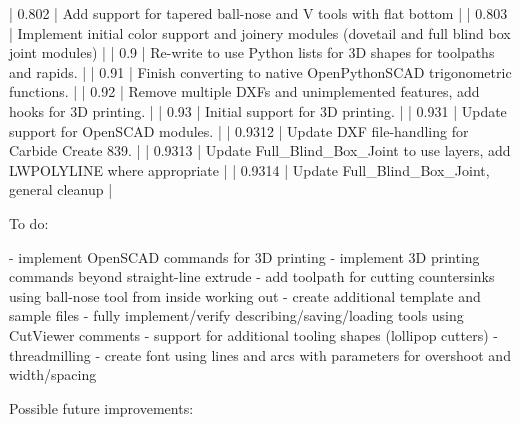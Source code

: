 \documentclass{ltxdoc}
\begin{document}
\begin{readme}
| 0.802         | Add support for tapered ball-nose and  V tools with flat bottom                                                                                                                 |
| 0.803         | Implement initial color support and joinery modules (dovetail and full blind box joint modules)                                                                                 |
| 0.9           | Re-write to use Python lists for 3D shapes for toolpaths and rapids.                                                                                                            |
| 0.91          | Finish converting to native OpenPythonSCAD trigonometric functions.                                                                                                             |
| 0.92          | Remove multiple DXFs and unimplemented features, add hooks for 3D printing.                                                                                                     |
| 0.93          | Initial support for 3D printing.                                                                                                                                                |
| 0.931         | Update support for OpenSCAD modules.                                                                                                                                            |
| 0.9312        | Update DXF file-handling for Carbide Create 839.                                                                                                                                |
| 0.9313        | Update Full_Blind_Box_Joint to use layers, add LWPOLYLINE where appropriate                                                                                                  |
| 0.9314        | Update Full_Blind_Box_Joint, general cleanup                                                                                                  |

To do:

 - implement OpenSCAD commands for 3D printing
 - implement 3D printing commands beyond straight-line extrude
 - add toolpath for cutting countersinks using ball-nose tool from inside working out
 - create additional template and sample files
 - fully implement/verify describing/saving/loading tools using CutViewer comments
 - support for additional tooling shapes (lollipop cutters)
 - threadmilling
 - create font using lines and arcs with parameters for overshoot and width/spacing

Possible future improvements:


\end{readme}
\end{document}
